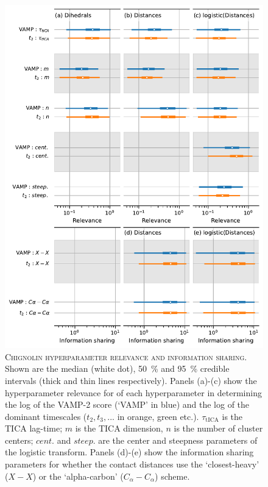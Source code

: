 \documentclass{article}
\begin{document}
\begin{figure}
    \centering
    \includegraphics[height=0.8\textheight]{figures/sensitivities/cln025_sensitivity.pdf}
    \caption{\textsc{Chignolin hyperparameter relevance and information sharing}. Shown are the  median (white dot), \SI{50}{\percent} and \SI{95}{\percent} credible intervals (thick and thin lines respectively).  Panels (a)-(c) show the hyperparameter relevance for of each hyperparameter in determining the log of the VAMP-2 score (`VAMP' in blue) and the log of the dominant timescales ($t_{2}, t_{3}, ...$ in orange, green etc.). $\tau_{\mathrm{tICA}}$ is the TICA lag-time; $m$ is the TICA dimension, $n$ is the number of cluster centers; $cent.$ and $steep.$ are the center and steepness parameters of the logistic transform. Panels (d)-(e) show the information sharing parameters for whether the contact distances use the `closest-heavy' ($X-X$) or the `alpha-carbon' ($C_{\alpha}-C_{\alpha}$) scheme.  }
    \label{fig:cln025_sense}
\end{figure}
\end{document}
